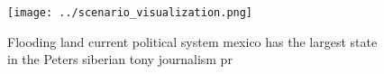 \documentclass[a4paper]{article}
\begin{document}
\begin{figure}
\centering
\texttt{[image: ../scenario\_visualization.png]}
\caption{Flooding land current political system mexico has the largest state in the Peters siberian tony journalism pr
}
\end{figure}
 
\end{document}
